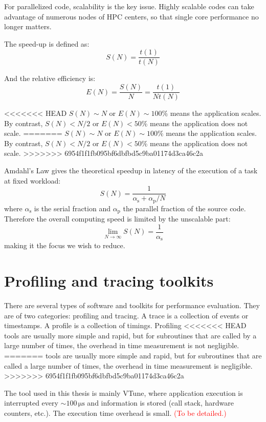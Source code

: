 For parallelized code, scalability is the key issue. Highly scalable
codes can take advantage of numerous nodes of HPC centers, so that
single core performance no longer matters. 

The speed-up is defined as:
\begin{equation}
S(N)=\dfrac{t(1)}{t(N)}
\end{equation}


And the relative efficiency is:
\begin{equation}
E(N)=\dfrac{S(N)}{N}=\dfrac{t(1)}{Nt(N)}
\end{equation}


<<<<<<< HEAD
$S(N)\sim N$ or $E(N)\sim100\%$ means the application scales. By
contrast, $S(N)<N/2$ or $E(N)<50\%$ means the application does not
scale. 
=======
$S(N)\sim N$ or $E(N)\sim100\%$ means the application scales. 
By contrast, $S(N)<N/2$ or $E(N)<50\%$ means the application does
not scale. 
>>>>>>> 6954f1f1fb095bf6dbfbd5c9ba01174d3ca46c2a

Amdahl's Law gives the theoretical speedup in latency of the execution
of a task at fixed workload:
\begin{equation}
S(N)=\dfrac{1}{\alpha_{\mathrm{s}}+\alpha_{\mathrm{p}}/N}
\end{equation}
where $\alpha_{\mathrm{s}}$ is the serial fraction and $\alpha_{\mathrm{p}}$
the parallel fraction of the source code. Therefore the overall computing
speed is limited by the unscalable part:
\begin{equation}
\lim_{N\rightarrow\infty}S(N)=\frac{1}{\alpha_{\mathrm{s}}}
\end{equation}
making it the focus we wish to reduce.


\section{Profiling and tracing toolkits}

There are several types of software and toolkits for performance evaluation.
They are of two categories: profiling and tracing. A trace is a collection
of events or timestamps. A profile is a collection of timings. Profiling
<<<<<<< HEAD
tools are usually more simple and rapid, but for subroutines that
are called by a large number of times, the overhead in time measurement
is not negligible. 
=======
tools are usually more simple and rapid, but for subroutines that are called
a large number of times, the overhead in time measurement is negligible. 
>>>>>>> 6954f1f1fb095bf6dbfbd5c9ba01174d3ca46c2a

The tool used in this thesis is mainly VTune, where application execution
is interrupted every $\sim100\,\mathrm{\mu s}$ and information is
stored (call stack, hardware counters, etc.). The execution time overhead
is small. \textcolor{red}{(To be detailed.)}
